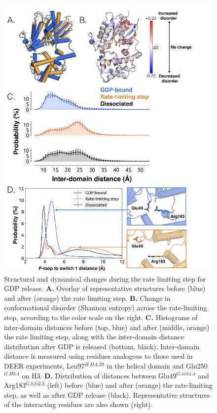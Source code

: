\documentclass[../main.tex]{subfiles}
\begin{document}
        \begin{figure}[H] %
            \centering
            \includegraphics[width=4.7in]{ch4-fig2.png}
            \caption[Structural and dynamical changes during the rate limiting step for GDP release.]
                {Structural and dynamical changes during the rate limiting step for GDP release. \textbf{A.} Overlay of representative structures before (blue) and after (orange) the rate limiting step. \textbf{B.} Change in conformational disorder (Shannon entropy) across the rate-limiting step, according to the color scale on the right. \textbf{C.} Histograms of inter-domain distances before (top, blue) and after (middle, orange) the rate limiting step, along with the inter-domain distance distribution after GDP is released (bottom, black). Inter-domain distance is measured using residues analogous to those used in DEER experiments\cite{Dror:2015bg}, Leu97$^{H.HA.29}$ in the helical domain and Glu250$^{G.H3.4}$ on H3. \textbf{D.} Distribution of distances between Glu49$^{G.s1h1.4}$ and Arg183$^{G.hfs2.2}$ (left) before (blue) and after (orange) the rate-limiting step, as well as after GDP release (black). Representative structures of the interacting residues are also shown (right).}
            \label{fig:ch4-fig2}
        \end{figure}
\end{document}
